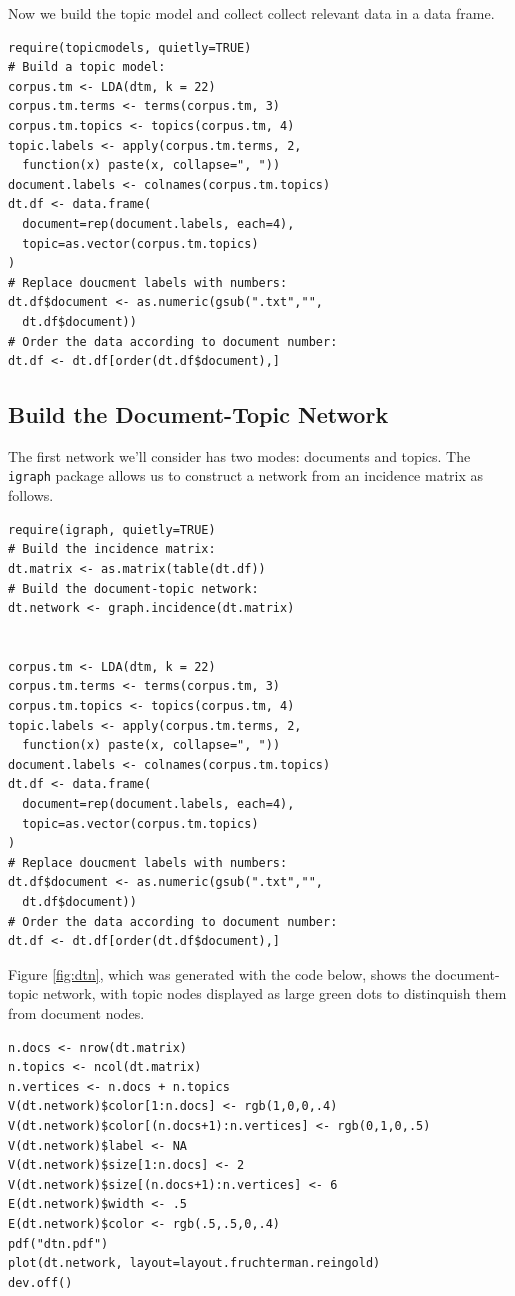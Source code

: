 \documentclass[%
	final,
	notitlepage,
	narroweqnarray,
	inline,
	]{ieee}
\begin{document}
Now we build the topic model and collect collect relevant data in a data frame.

\begin{verbatim}
require(topicmodels, quietly=TRUE)
# Build a topic model:
corpus.tm <- LDA(dtm, k = 22)
corpus.tm.terms <- terms(corpus.tm, 3)
corpus.tm.topics <- topics(corpus.tm, 4)
topic.labels <- apply(corpus.tm.terms, 2, 
  function(x) paste(x, collapse=", "))
document.labels <- colnames(corpus.tm.topics)
dt.df <- data.frame(
  document=rep(document.labels, each=4),
  topic=as.vector(corpus.tm.topics)
)
# Replace doucment labels with numbers:
dt.df$document <- as.numeric(gsub(".txt","",
  dt.df$document))
# Order the data according to document number:
dt.df <- dt.df[order(dt.df$document),]
\end{verbatim}


\subsection{Build the Document-Topic Network}
\PARstart The first network we'll consider has two modes: documents and topics. 
The {\tt igraph} package allows us to construct a network from an incidence 
matrix as follows.

\begin{verbatim}
require(igraph, quietly=TRUE)
# Build the incidence matrix:
dt.matrix <- as.matrix(table(dt.df))
# Build the document-topic network:
dt.network <- graph.incidence(dt.matrix)


corpus.tm <- LDA(dtm, k = 22)
corpus.tm.terms <- terms(corpus.tm, 3)
corpus.tm.topics <- topics(corpus.tm, 4)
topic.labels <- apply(corpus.tm.terms, 2, 
  function(x) paste(x, collapse=", "))
document.labels <- colnames(corpus.tm.topics)
dt.df <- data.frame(
  document=rep(document.labels, each=4),
  topic=as.vector(corpus.tm.topics)
)
# Replace doucment labels with numbers:
dt.df$document <- as.numeric(gsub(".txt","",
  dt.df$document))
# Order the data according to document number:
dt.df <- dt.df[order(dt.df$document),]
\end{verbatim}

Figure \ref{fig:dtn}, which was generated with the code below, 
shows the document-topic network, with 
topic nodes displayed as large green dots to distinquish them from
document nodes.


\begin{verbatim}
n.docs <- nrow(dt.matrix)
n.topics <- ncol(dt.matrix)
n.vertices <- n.docs + n.topics
V(dt.network)$color[1:n.docs] <- rgb(1,0,0,.4)
V(dt.network)$color[(n.docs+1):n.vertices] <- rgb(0,1,0,.5)
V(dt.network)$label <- NA
V(dt.network)$size[1:n.docs] <- 2
V(dt.network)$size[(n.docs+1):n.vertices] <- 6
E(dt.network)$width <- .5
E(dt.network)$color <- rgb(.5,.5,0,.4)
pdf("dtn.pdf")
plot(dt.network, layout=layout.fruchterman.reingold)
dev.off()
\end{verbatim}
\end{document}

